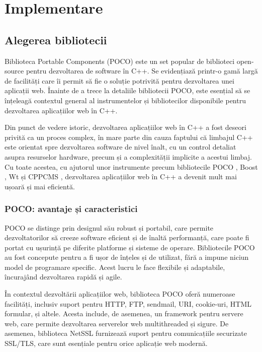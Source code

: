 \chapter{Implementare}

\section{Alegerea bibliotecii}

Biblioteca Portable Components (POCO) este un set popular de biblioteci open-source pentru dezvoltarea de software în C++. Se evidențiază printr-o gamă largă de facilități care îi permit să fie o soluție potrivită pentru dezvoltarea unei aplicații web. Înainte de a trece la detaliile bibliotecii POCO, este esențial să se înțeleagă contextul general al instrumentelor și bibliotecilor disponibile pentru dezvoltarea aplicațiilor web în C++.

Din punct de vedere istoric, dezvoltarea aplicațiilor web în C++ a fost deseori privită ca un proces complex, în mare parte din cauza faptului că limbajul C++ este orientat spre dezvoltarea software de nivel înalt, cu un control detaliat asupra resurselor hardware, precum și a complexității implicite a acestui limbaj. Cu toate acestea, cu ajutorul unor instrumente precum bibliotecile POCO \cite{poco-docs}, Boost \cite{boost-docs}, Wt \cite{wt-docs} și CPPCMS \cite{cppcms-docs}, dezvoltarea aplicațiilor web în C++ a devenit mult mai ușoară și mai eficientă.

\subsection{POCO: avantaje și caracteristici}

POCO se distinge prin designul său robust și portabil, care permite dezvoltatorilor să creeze software eficient și de înaltă performanță, care poate fi portat cu ușurință pe diferite platforme și sisteme de operare. Bibliotecile POCO au fost concepute pentru a fi ușor de înțeles și de utilizat, fără a impune niciun model de programare specific. Acest lucru le face flexibile și adaptabile, încurajând dezvoltarea rapidă și agile.

În contextul dezvoltării aplicațiilor web, biblioteca POCO oferă numeroase facilități, inclusiv suport pentru HTTP, FTP, sendmail, URI, cookie-uri, HTML formular, și altele. Acesta include, de asemenea, un framework pentru servere web, care permite dezvoltarea serverelor web multithreaded și sigure. De asemenea, biblioteca NetSSL furnizează suport pentru comunicațiile securizate SSL/TLS, care sunt esențiale pentru orice aplicație web modernă.

